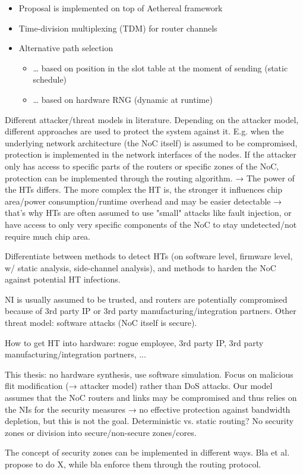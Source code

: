 \begin{itemize}
\begin{itemize}
            \item Proposal is implemented on top of Aethereal framework
            \item Time-division multiplexing (TDM) for router channels
            \item Alternative path selection
                \begin{itemize}
                    \item … based on position in the slot table at the moment of sending (static schedule)
                    \item … based on hardware RNG (dynamic at runtime)
                \end{itemize}
        \end{itemize}
\end{itemize}

Different attacker/threat models in literature. Depending on the attacker model, different approaches are used to protect the system against it.
E.g. when the underlying network architecture (the NoC itself) is assumed to be compromised, protection is implemented in the network interfaces
of the nodes. If the attacker only has access to specific parts of the routers or specific zones of the NoC, protection can be implemented through
the routing algorithm. → The power of the HTs differs. The more complex the HT is, the stronger it influences chip area/power consumption/runtime
overhead and may be easier detectable → that's why HTs are often assumed to use "small" attacks like fault injection, or have access to only very
specific components of the NoC to stay undetected/not require much chip area.

Differentiate between methods to detect HTs (on software level, firmware level, w/ static analysis, side-channel analysis), and methods to harden
the NoC against potential HT infections.

NI is usually assumed to be trusted, and routers are potentially compromised because of 3rd party IP or 3rd party manufacturing/integration
partners. Other threat model: software attacks (NoC itself is secure).

How to get HT into hardware: rogue employee, 3rd party IP, 3rd party manufacturing/integration partners, ...

This thesis: no hardware synthesis, use software simulation. Focus on malicious flit modification (→ attacker model) rather than DoS attacks. Our
model assumes that the NoC routers and links may be compromised and thus relies on the NIs for the security measures → no effective protection
against bandwidth depletion, but this is not the goal.
Deterministic vs. static routing? No security zones or division into secure/non-secure zones/cores.

The concept of security zones can be implemented in different ways. Bla et al. propose to do X, while bla enforce them through the routing protocol.

